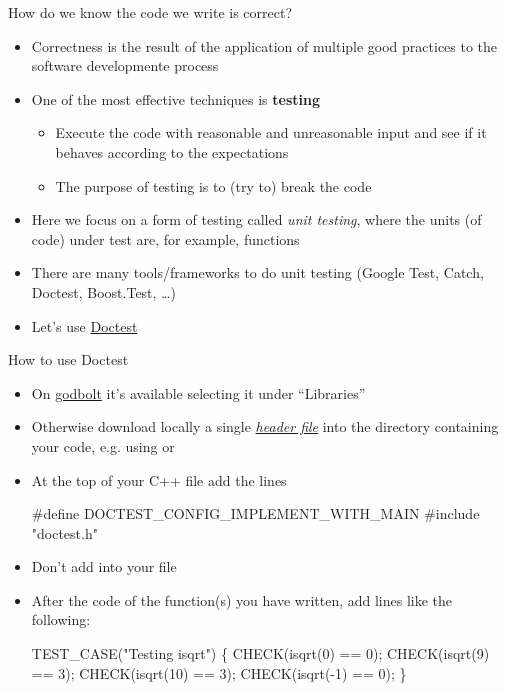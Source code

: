 \begin{frame}[fragile]{How do we know the code we write is correct?}

  \begin{itemize}[<+->]
  \item Correctness is the result of the application of multiple good practices
    to the software developmente process
  \item One of the most effective techniques is \textbf{testing}
    \begin{itemize}
    \item Execute the code with reasonable and unreasonable input and see if it
      behaves according to the expectations
    \item The purpose of testing is to (try to) \alert{break} the code
    \end{itemize}
  \item Here we focus on a form of testing called \textit{unit testing}, where
    the units (of code) under test are, for example, functions
  \item There are many tools/frameworks to do unit testing (Google Test, Catch,
    Doctest, Boost.Test, \ldots)
  \item Let's use \href{https://github.com/onqtam/doctest}{Doctest}
  \end{itemize}
\end{frame}

\begin{frame}[fragile]{How to use Doctest}

  \begin{itemize}
  \item On \href{https://godbolt.org/}{godbolt} it's available selecting it
    under ``Libraries''
  \item Otherwise download locally a single
    \href{https://raw.githubusercontent.com/onqtam/doctest/master/doctest/doctest.h}{\textit{header
        file}} into the directory containing your code, e.g. using 
    or 
  \item At the top of your C++ file add the lines
    \begin{codeblock}
#define DOCTEST\_CONFIG\_IMPLEMENT\_WITH\_MAIN
#include "doctest.h"\end{codeblock}
  \item Don't add  into your file
  \item After the code of the function(s) you have written, add lines like the
    following:
    \begin{codeblock}
TEST_CASE("Testing isqrt") \{
  CHECK(isqrt(0) == 0);
  CHECK(isqrt(9) == 3);
  CHECK(isqrt(10) == 3);
  CHECK(isqrt(-1) == 0);
  \ddd
\}\end{codeblock}

  \end{itemize}

\end{frame}

